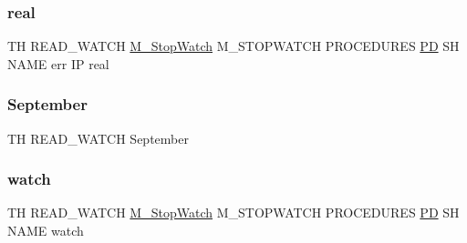 \subsubsection{\texorpdfstring{real}{real}}
{\footnotesize\ttfamily TH R\+E\+A\+D\+\_\+\+W\+A\+T\+CH \hyperlink{option__stopwatch_83_8txt_aa2011fc45a5e502e87ee50996a8a9305}{M\+\_\+\+Stop\+Watch} M\+\_\+\+S\+T\+O\+P\+W\+A\+T\+CH P\+R\+O\+C\+E\+D\+U\+R\+ES \hyperlink{what__overview_81_8txt_a85f26da5a4481fbdb0d9c79f2b94de3e}{PD} SH N\+A\+ME err IP real}

\mbox{\label{read__watch_83_8txt_a01edc0babc2c7bff9f6dea0d461744bc}} 
\subsubsection{\texorpdfstring{September}{September}}
{\footnotesize\ttfamily TH R\+E\+A\+D\+\_\+\+W\+A\+T\+CH September}

\mbox{\label{read__watch_83_8txt_ad2129669fa47b8899641309620add095}} 
\subsubsection{\texorpdfstring{watch}{watch}}
{\footnotesize\ttfamily TH R\+E\+A\+D\+\_\+\+W\+A\+T\+CH \hyperlink{option__stopwatch_83_8txt_aa2011fc45a5e502e87ee50996a8a9305}{M\+\_\+\+Stop\+Watch} M\+\_\+\+S\+T\+O\+P\+W\+A\+T\+CH P\+R\+O\+C\+E\+D\+U\+R\+ES \hyperlink{what__overview_81_8txt_a85f26da5a4481fbdb0d9c79f2b94de3e}{PD} SH N\+A\+ME watch}

